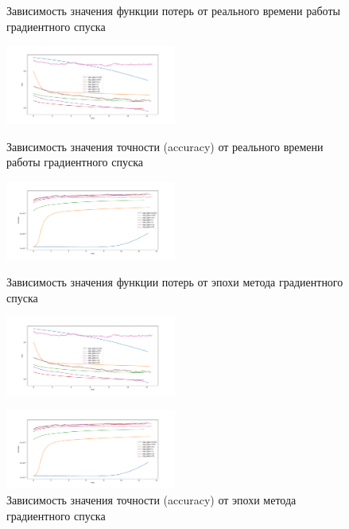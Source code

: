 \documentclass[a4paper, 11pt]{article}
\begin{document}
            \begin{figure}[H] \label{exp1}
                \begin{multicols}{2}
                    \begin{center}
                        \caption{Зависимость значения функции потерь от реального времени работы градиентного спуска} \label{exp4:sgd_func_time}
                        \includegraphics[width=0.5\textwidth, height=0.25\textheight]{../graphs/exp1_func_GD_alpha_time_beta=0,001.pdf}
                        
                        \caption{Зависимость значения точности (accuracy) от реального времени работы градиентного спуска} \label{exp4:sgd_acc_time}
                        \includegraphics[width=0.5\textwidth, height=0.25\textheight]{../graphs/exp1_accuracy_GD_alpha_time_beta=0,001.pdf}
                        
                        \caption{Зависимость значения функции потерь от эпохи метода градиентного спуска} \label{exp4:sgd_func_iter}
                        \includegraphics[width=0.5\textwidth, height=0.25\textheight]{../graphs/exp1_func_GD_alpha_time_beta=0,001.pdf}
                        
                        \caption{Зависимость значения точности (accuracy) от эпохи метода градиентного спуска} \label{exp4:sgd_acc_iter}
                        \includegraphics[width=0.5\textwidth, height=0.25\textheight]{../graphs/exp1_accuracy_GD_alpha_time_beta=0,001.pdf}
                    \end{center}
                \end{multicols}
            \end{figure}
            
\end{document}
